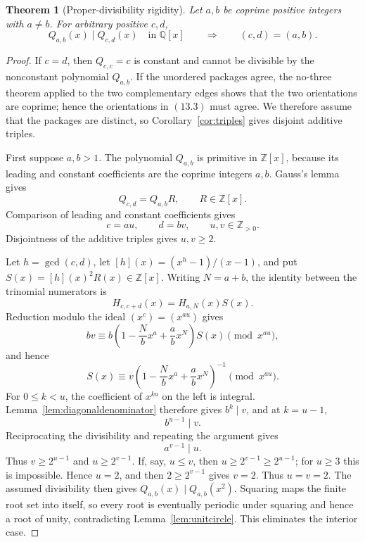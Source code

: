 \documentclass[11pt]{article}
\newtheorem{theorem}{Theorem}[section]
\theoremstyle{definition}
\newcommand{\Q}{\mathbb Q}
\newcommand{\Z}{\mathbb Z}
\begin{document}
\begin{theorem}[Proper-divisibility rigidity]\label{thm:nodivision}
Let \(a,b\) be coprime positive integers with \(a\neq b\).  For arbitrary
positive \(c,d\),
\begin{equation}
 Q_{a,b}(x)\mid Q_{c,d}(x)\quad\text{in }\Q[x]
 \qquad\Longrightarrow\qquad(c,d)=(a,b).
 \tag{13.3}
\end{equation}
\end{theorem}

\begin{proof}
If \(c=d\), then \(Q_{c,c}=c\) is constant and cannot be divisible by the
nonconstant polynomial \(Q_{a,b}\).  If the unordered packages agree, the
no-three theorem applied to the two
complementary edges shows that the two orientations are coprime; hence the
orientations in \((13.3)\) must agree.  We therefore assume that the packages
are distinct, so Corollary~\ref{cor:triples} gives disjoint additive triples.

First suppose \(a,b>1\).  The polynomial \(Q_{a,b}\) is primitive in
\(\Z[x]\), because its leading and constant coefficients are the coprime
integers \(a,b\).  Gauss's lemma gives
\[
 Q_{c,d}=Q_{a,b}R,\qquad R\in\Z[x].
\]
Comparison of leading and constant coefficients gives
\begin{equation}
 c=au,\qquad d=bv,\qquad u,v\in\Z_{>0}.
 \tag{13.4}
\end{equation}
Disjointness of the additive triples gives \(u,v\geq2\).

Let \(h=\gcd(c,d)\), let \([h](x)=(x^h-1)/(x-1)\), and put
\(S(x)=[h](x)^2R(x)\in\Z[x]\).  Writing \(N=a+b\), the identity between
the trinomial numerators is
\[
 H_{c,c+d}(x)=H_{a,N}(x)S(x).
\]
Reduction modulo the ideal \((x^{c})=(x^{au})\) gives
\[
 b v\equiv
 b\left(1-\frac Nb x^a+\frac ab x^N\right)S(x)
 \pmod{x^{au}},
\]
and hence
\begin{equation}
 S(x)\equiv
 v\left(1-\frac Nb x^a+\frac ab x^N\right)^{-1}
 \pmod{x^{au}}.
 \tag{13.5}
\end{equation}
For \(0\leq k<u\), the coefficient of \(x^{ka}\) on the left is integral.
Lemma~\ref{lem:diagonaldenominator} therefore gives \(b^k\mid v\), and at
\(k=u-1\),
\begin{equation}
 b^{u-1}\mid v.
 \tag{13.6}
\end{equation}
Reciprocating the divisibility and repeating the argument gives
\begin{equation}
 a^{v-1}\mid u.
 \tag{13.7}
\end{equation}
Thus \(v\geq2^{u-1}\) and \(u\geq2^{v-1}\).  If, say,
\(u\leq v\), then \(u\geq2^{v-1}\geq2^{u-1}\); for \(u\geq3\) this is
impossible.  Hence \(u=2\), and then \(2\geq2^{v-1}\) gives \(v=2\).
Thus \(u=v=2\).  The
assumed divisibility then gives
\(Q_{a,b}(x)\mid Q_{a,b}(x^2)\).  Squaring maps the finite root set into
itself, so every root is eventually periodic under squaring and hence a root
of unity, contradicting Lemma~\ref{lem:unitcircle}.  This eliminates the
interior case.


\end{proof}
\end{document}
